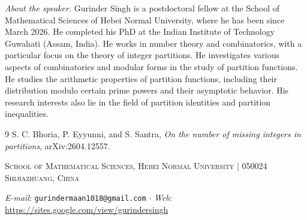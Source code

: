 \documentclass[a4paper,10pt]{amsart}
\begin{document}


\vskip 0.5cm


\textit{About the speaker.} Gurinder Singh is a postdoctoral fellow at the School of Mathematical Sciences of Hebei Normal University, where he has been since March 2026. He completed his PhD at the Indian Institute of Technology Guwahati (Assam, India). He works in number theory and combinatorics, with
a particular focus on the theory of integer partitions. He investigates various aspects of combinatorics and modular forms in the study of partition functions. He studies the arithmetic properties of partition functions, including their distribution modulo certain prime powers and their asymptotic behavior. His research interests also lie in the field of partition identities and partition inequalities.


	

\begin{thebibliography}{9}
S. C. Bhoria, P. Eyyunni, and S. Santra, 
\emph{On the number of missing integers in partitions}, 
arXiv:2604.12557.
\end{thebibliography}


\vskip 0.5cm                                                                                                                         	


	
{\footnotesize
\textsc{%
	School of Mathematical Sciences, Hebei Normal University | 050024 Shijiazhuang, China}%
}
	

			
	
{\footnotesize%
	\textit{E-mail}: \texttt{gurindermaan1018@gmail.com} 
	$\cdot$ 
	\textit{Web}: \url{https://sites.google.com/view/gurindersingh}
}
	
\end{document}
